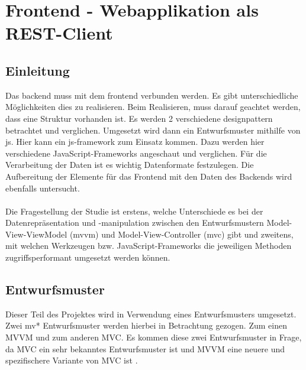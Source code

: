 
\section{Frontend - Webapplikation als REST-Client}
\subsection{Einleitung}
Das \Gls{backend} muss mit dem \Gls{frontend} verbunden werden. Es gibt unterschiedliche Möglichkeiten dies zu realisieren. Beim Realisieren, muss darauf geachtet werden, dass eine Struktur vorhanden ist. Es werden 2 verschiedene \Gls{designpattern} betrachtet und verglichen. Umgesetzt wird dann ein Entwurfsmuster mithilfe von \Gls{js}. Hier kann ein \Gls{js}-\Gls{framework} zum Einsatz kommen. Dazu werden hier verschiedene JavaScript-Frameworks angeschaut und verglichen. Für die Verarbeitung der Daten ist es wichtig Datenformate festzulegen. Die Aufbereitung der Elemente für das Frontend mit den Daten des Backends wird ebenfalls untersucht.
\\\\
Die Fragestellung der Studie ist erstens, welche Unterschiede es bei der Datenrepräsentation und -manipulation zwischen den Entwurfsmustern Model-View-ViewModel (\Gls{mvvm}) und Model-View-Controller (\Gls{mvc}) gibt und zweitens, mit welchen Werkzeugen bzw. JavaScript-Frameworks die jeweiligen Methoden zugriffsperformant umgesetzt werden können.
\subsection{Entwurfsmuster}
Dieser Teil des Projektes wird in Verwendung eines Entwurfsmusters umgesetzt. Zwei \Gls{mv*} Entwurfsmuster werden hierbei in Betrachtung gezogen. Zum einen MVVM und zum anderen MVC. Es kommen diese zwei Entwurfsmuster in Frage, da MVC ein sehr bekanntes Entwurfsmuster ist und MVVM eine neuere und spezifischere Variante von MVC ist \cite{mvvm_vue}.
